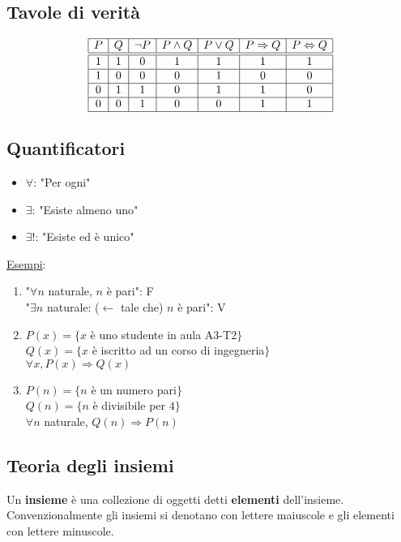 \documentclass{article}
\begin{document}
\subsection*{Tavole di verità}
\begin{displaymath}
	\begin{array}{|c|c|c|c|c|c|c|c|c|c|c|}
		\hline
		P & Q & \neg P & P\wedge Q & P\vee Q & P\Rightarrow Q & P\Leftrightarrow Q \\
		\hline\hline
		1 & 1 & 0      & 1         & 1       & 1              & 1                  \\
		\hline
		1 & 0 & 0      & 0         & 1       & 0              & 0                  \\
		\hline
		0 & 1 & 1      & 0         & 1       & 1              & 0                  \\
		\hline
		0 & 0 & 1      & 0         & 0       & 1              & 1                  \\
		\hline
	\end{array}
\end{displaymath}
\subsection*{Quantificatori}
\begin{itemize}
	\item $\forall$: "Per ogni"
	\item $\exists$: "Esiste almeno uno"
	\item $\exists!$: "Esiste ed è unico"
\end{itemize}

\ul{Esempi}:
\begin{enumerate}
	\item "$\forall n$ naturale, $n$ è pari": F\\
	      "$\exists n$ naturale: ($\leftarrow$ tale che) $n$ è pari": V
	\item $P(x)=\{x$ è uno studente in aula A3-T2$\}$\\
	      $Q(x)=\{x$ è iscritto ad un corso di ingegneria$\}$\\
	      $\forall x, P(x)\Rightarrow Q(x)$
	\item $P(n)=\{n$ è un numero pari$\}$\\
	      $Q(n)=\{n$ è divisibile per $4\}$\\
	      $\forall n$ naturale, $Q(n)\Rightarrow P(n)$
\end{enumerate}

\subsection*{Teoria degli insiemi}
Un \textbf{insieme} è una collezione di oggetti detti \textbf{elementi} dell'insieme.\\
Convenzionalmente gli insiemi si denotano con lettere maiuscole e gli elementi con lettere minuscole.
\end{document}
